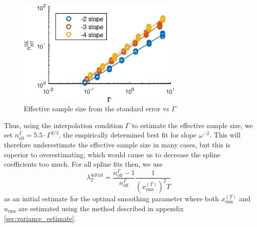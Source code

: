 \documentclass[10pt,journal]{IEEEtran}
\begin{document}
\begin{figure}
  \centerline{\includegraphics[width=19pc,angle=0]{figures/dofVsGamma}}
  
  \caption{Effective sample size from the standard error vs $\Gamma$}
  \label{dofVsGamma}
\end{figure}

Thus, using the interpolation condition $\Gamma$ to estimate the effective sample size, we set $n_{\textrm{eff}}^\Gamma = 5.5 \cdot \Gamma^{2/3}$, the empirically determined best fit for slope $\omega^{-2}$. This will therefore underestimate the effective sample size in many cases, but this is superior to overestimating, which would cause us to decrease the spline coefficients too much. For all spline fits then, we use
\begin{equation}
\label{lambda_initial_guess}
\lambda^{\textrm{initial}}_T = \frac{n_{\textrm{eff}}^\Gamma-1}{n_{\textrm{eff}}^\Gamma} \frac{1}{ \left(x^{(T)}_{\textrm{rms}}\right)^2  T}
\end{equation}
as an initial estimate for the optimal smoothing parameter where both $x^{(T)}_{\textrm{rms}}$ and $u_\textrm{rms}$ are estimated using the method described in appendix \ref{sec:variance_estimate}.

\end{document}
